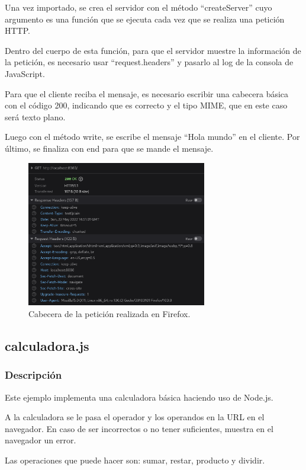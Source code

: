 \documentclass{article}
\begin{document}
Una vez importado, se crea el servidor con el método ``createServer'' cuyo argumento es una función que se ejecuta cada vez que se realiza una petición HTTP.

Dentro del cuerpo de esta función, para que el servidor muestre la información de la petición, es necesario usar ``request.headers'' y pasarlo al log de la consola de JavaScript.

Para que el cliente reciba el mensaje, es necesario escribir una cabecera básica con el código 200, indicando que es correcto y el tipo MIME, que en este caso será texto plano.

Luego con el método write, se escribe el mensaje ``Hola mundo'' en el cliente. Por último, se finaliza con end para que se mande el mensaje. %

\begin{figure}[H]
    \centering
    \includegraphics[width=0.7\textwidth]{images/header.png}
    \caption{Cabecera de la petición realizada en Firefox.}
\end{figure}

\subsection{calculadora.js}
\subsubsection{Descripción}
Este ejemplo implementa una calculadora básica haciendo uso de Node.js. 

A la calculadora se le pasa el operador y los operandos en la URL en el navegador. En caso de ser incorrectos o no tener suficientes, muestra en el navegador un error.

Las operaciones que puede hacer son: sumar, restar, producto y dividir.
\end{document}
